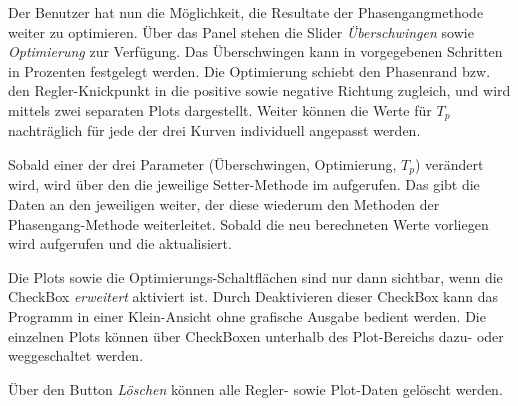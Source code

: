 Der Benutzer  hat nun die  M\"oglichkeit, die Resultate  der Phasengangmethode
weiter  zu  optimieren. \"Uber  das   Panel    stehen  die
Slider  \emph{\"Uberschwingen} sowie  \emph{Optimierung} zur  Verf\"ugung. Das
\"Uberschwingen  kann  in  vorgegebenen   Schritten  in  Prozenten  festgelegt
werden. Die Optimierung  schiebt den Phasenrand bzw.  den Regler-Knickpunkt in
die positive sowie negative Richtung zugleich, und wird mittels zwei separaten
Plots dargestellt. Weiter k\"onnen die  Werte f\"ur $T_p$ nachtr\"aglich f\"ur
jede der drei Kurven individuell angepasst werden.

Sobald  einer   der  drei  Parameter  (\"Uberschwingen,   Optimierung,  $T_p$)
ver\"andert  wird,   wird  \"uber   den     die  jeweilige
Setter-Methode im  aufgerufen. Das   gibt die Daten an
den jeweiligen   weiter, der diese wiederum  den Methoden der
Phasengang-Methode  weiterleitet. Sobald die  neu berechneten  Werte vorliegen
wird  aufgerufen und die  aktualisiert.

Die  Plots  sowie die  Optimierungs-Schaltfl\"achen  sind  nur dann  sichtbar,
wenn die  CheckBox \emph{erweitert}  aktiviert ist. Durch  Deaktivieren dieser
CheckBox  kann das  Programm  in einer  Klein-Ansicht  ohne grafische  Ausgabe
bedient werden. Die  einzelnen Plots k\"onnen \"uber  CheckBoxen unterhalb des
Plot-Bereichs dazu- oder weggeschaltet werden.

\"Uber  den Button  \emph{L\"oschen}  k\"onnen alle  Regler- sowie  Plot-Daten
gel\"oscht werden.

